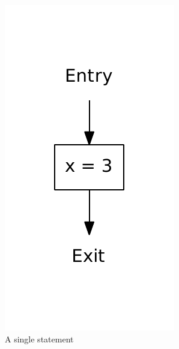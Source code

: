 \begin{figure}
  \begin{subfigure}[b]{0.49\textwidth}
    \center
    \includegraphics[scale=0.5]{figures/simple.pdf}
    \caption{A single statement}
  \end{subfigure}
  ~
  \begin{subfigure}[b]{0.49\textwidth}
    \center

\end{subfigure}
\end{figure}
